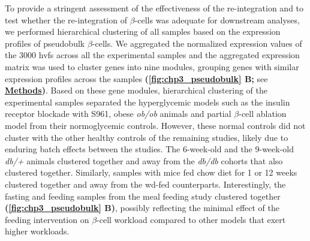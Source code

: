 \par To provide a stringent assessment of the effectiveness of the re-integration and to test whether the re-integration of $\beta$-cells was adequate for downstream analyses, we performed hierarchical clustering of all samples based on the expression profiles of pseudobulk $\beta$-cells. We aggregated the normalized expression values of the 3000 \glspl{hvf} across all the experimental samples and the aggregated expression matrix was used to cluster genes into nine modules, grouping genes with similar expression profiles across the samples \textbf{(\autoref{fig:chp3_pseudobulk} B;} see \hyperref[subsubsec:met_chp3_pseudo]{\textbf{Methods}}\textbf{)}. Based on these gene modules, hierarchical clustering of the experimental samples separated the hyperglycemic models such as the insulin receptor blockade with S961, obese \textit{ob/ob} animals and partial $\beta$-cell ablation model from their normoglycemic controls. However, these normal controls did not cluster with the other healthy controls of the remaining studies, likely due to enduring batch effects between the studies. The 6-week-old and the 9-week-old \textit{db/+} animals clustered together and away from the \textit{db/db} cohorts that also clustered together. Similarly, samples with mice fed chow diet for 1 or 12 weeks clustered together and away from the \gls{wd}-fed counterparts. Interestingly, the fasting and feeding samples from the meal feeding study clustered together \textbf{(\autoref{fig:chp3_pseudobulk} B)}, possibly reflecting the minimal effect of the feeding intervention on $\beta$-cell workload compared to other models that exert higher workloads.\\

